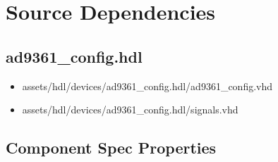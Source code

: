 \documentclass{article}
\def\comp{ad9361\_config}
\begin{document}
\section*{Source Dependencies}
\subsection*{\comp.hdl}
\begin{itemize}
  \item assets/hdl/devices/\comp.hdl/\comp.vhd
  \item assets/hdl/devices/ad9361\_config.hdl/signals.vhd
\end{itemize}
\begin{landscape}
  \section*{Component Spec Properties}
  \begin{scriptsize}

\end{scriptsize}
\end{landscape}
\end{document}
